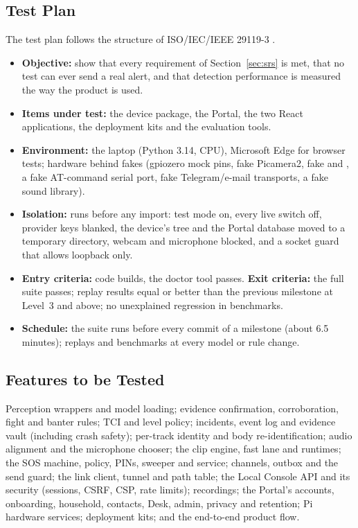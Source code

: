 \subsection{Test Plan}
The test plan follows the structure of ISO/IEC/IEEE 29119-3 \cite{iso29119}.
\begin{itemize}
\item \textbf{Objective:} show that every requirement of Section~\ref{sec:srs} is met, that no test can ever send a real alert, and that detection performance is measured the way the product is used.
\item \textbf{Items under test:} the device package, the Portal, the two React applications, the deployment kits and the evaluation tools.
\item \textbf{Environment:} the laptop (Python 3.14, CPU), Microsoft Edge for browser tests; hardware behind fakes (gpiozero mock pins, fake Picamera2, fake  and , a fake AT-command serial port, fake Telegram/e-mail transports, a fake sound library).
\item \textbf{Isolation:}  runs before any import: test mode on, every live switch off, provider keys blanked, the device's  tree and the Portal database moved to a temporary directory, webcam and microphone blocked, and a socket guard that allows loopback only.
\item \textbf{Entry criteria:} code builds, the doctor tool passes. \textbf{Exit criteria:} the full suite passes; replay results equal or better than the previous milestone at Level~3 and above; no unexplained regression in benchmarks.
\item \textbf{Schedule:} the suite runs before every commit of a milestone (about 6.5 minutes); replays and benchmarks at every model or rule change.
\end{itemize}

\subsection{Features to be Tested}
Perception wrappers and model loading; evidence confirmation, corroboration, fight and banter rules; TCI and level policy; incidents, event log and evidence vault (including crash safety); per-track identity and body re-identification; audio alignment and the microphone chooser; the clip engine, fast lane and runtimes; the SOS machine, policy, PINs, sweeper and service; channels, outbox and the send guard; the link client, tunnel and path table; the Local Console API and its security (sessions, CSRF, CSP, rate limits); recordings; the Portal's accounts, onboarding, household, contacts, Desk, admin, privacy and retention; Pi hardware services; deployment kits; and the end-to-end product flow.

